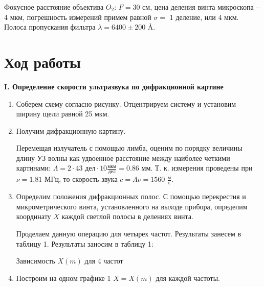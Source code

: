 \documentclass[12pt,a4paper]{article}
\begin{document}
	Фокусное расстояние объектива $ O_2$: $F = 30 $ см, цена деления винта микроскопа -- 4 мкм, погрешность измерений примем равной  $ \sigma = $ 1 деление, или 4 мкм. Полоса пропускания фильтра $ \lambda = 6400 \pm 200$ \AA.
	
    \section*{Ход работы}
	
	\begin{center}
		\textbf{I. Определение скорости ультразвука по дифракционной картине}
	\end{center}

	\begin{enumerate}
		\item Соберем схему согласно рисунку. Отцентрируем систему и установим ширину щели равной 25 мкм.
		
		\item Получим дифракционную картину.
		
		Перемещая излучатель с помощью лимба, оценим по порядку величины длину УЗ волны как удвоенное расстояние между наиболее четкими картинами: $\Lambda = 2 \cdot 43 \text{ дел}\cdot 10\frac{\text{мкм}}{\text{дел}} = 0.86$ мм.
        Т. к. измерения проведены при $\nu = 1.81$ МГц, то скорость звука $c=\Lambda \nu=1560$ $\frac{\text{м}}{\text{с}}$.
		
		\item Определим положения дифракционных полос. С помощью перекрестия и микрометрического винта, установленного на выходе прибора, определим координату $X$ каждой светлой полосы в делениях винта. 
		
		Проделаем данную операцию для четырех частот. Результаты занесем в таблицу 1.
		Результаты заносим в таблицу 1:
  
        \begin{table}[h!]
    	   \centering
    	   \footnotesize
    	   
    	   \caption{Зависимость $X(m)$ для 4 частот}
    	   \label{tab:t1}
        \end{table}	

  
		\item Построим на одном графике 1 $X = X(m)$ для каждой частоты.


\end{enumerate}
\end{document}

